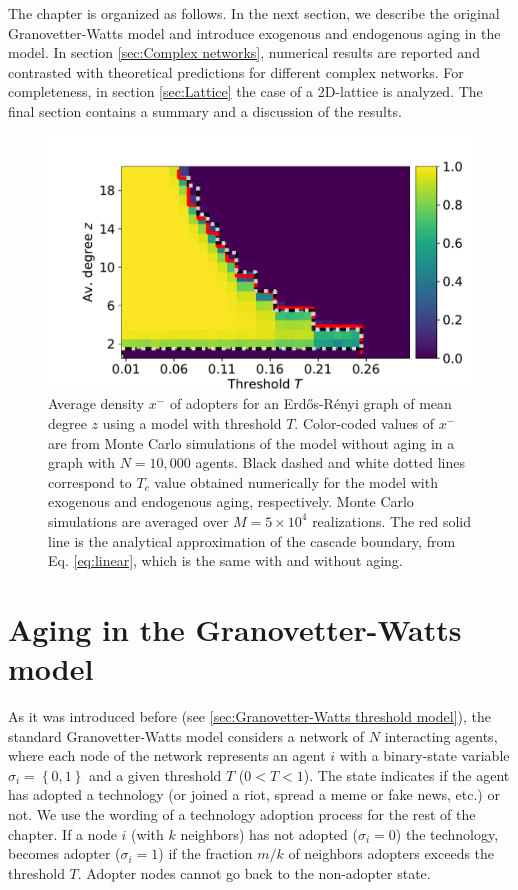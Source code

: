 The chapter is organized as follows. In the next section, we describe the original Granovetter-Watts model and introduce exogenous and endogenous aging in the model. In section \ref{sec:Complex networks}, numerical results are reported and contrasted with theoretical predictions for different complex networks. For completeness, in section \ref{sec:Lattice} the case of a 2D-lattice is analyzed. The final section contains a summary and a discussion of the results.

\begin{figure}
    \centering \captionsetup{font=sf}
    \includegraphics[width=0.65\columnwidth]{Figs/Aging_Threshold/cascade.pdf}
    \caption[Average density $x^{-}$ of adopters for an Erd\H{o}s-R\'enyi graph]{\label{fig:umbral} Average density $x^{-}$ of adopters for an Erd\H{o}s-R\'enyi graph of mean degree $z$ using a model with threshold $T$. Color-coded values of $x^{-}$ are from Monte Carlo simulations of the model without aging in a graph with $N = 10,000$ agents.  Black dashed and white dotted lines correspond to $T_c$ value obtained numerically for the model with exogenous and endogenous aging, respectively.  Monte Carlo simulations are averaged over $M = 5 \times 10^4$ realizations. The red solid line is the analytical approximation of the cascade boundary, from Eq. \eqref{eq:linear}, which is the same with and without aging.}
\end{figure}

\section{\label{sec:Threshold model with aging} Aging in the Granovetter-Watts model}

As it was introduced before (see \ref{sec:Granovetter-Watts threshold model}), the standard Granovetter-Watts model \cite{granovetter-1978,watts-2002} considers a network of $N$ interacting agents, where each node of the network represents an agent $i$ with a binary-state variable $\sigma_i = \left\{ 0,1 \right\}$  and a given threshold $T$ ($0<T<1$). The state indicates if the agent has adopted a technology (or joined a riot, spread a meme or fake news, etc.) or not. We use the wording of a technology adoption process for the rest of the chapter. If a node $i$ (with $k$ neighbors) has not adopted  ($\sigma_i = 0$) the technology, becomes adopter ($\sigma_i = 1$) if the fraction $m / k$ of neighbors adopters exceeds the threshold $T$. Adopter nodes cannot go back to the non-adopter state.

